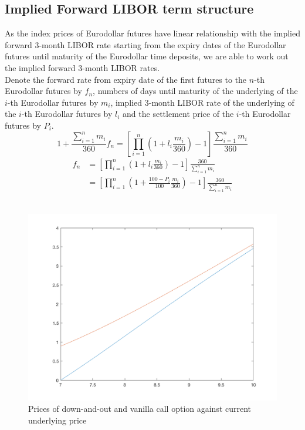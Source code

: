 \subsection{Implied Forward LIBOR term structure}
As the index prices of Eurodollar futures have linear relationship with the implied forward 3-month LIBOR rate starting from the expiry dates of the Eurodollar futures until maturity of the Eurodollar time deposits, we are able to work out the implied forward 3-month LIBOR rates.\\[4mm]
Denote the forward rate from expiry date of the first futures to the $n$-th Eurodollar futures by $f_{n}$, numbers of days until maturity of the underlying of the $i$-th Eurodollar futures by $m_{i}$, implied 3-month LIBOR rate of the underlying of the $i$-th Eurodollar futures by $l_{i}$ and the settlement price of the $i$-th Eurodollar futures by $P_{i}$.\\[4mm]
$$1 + \frac{\sum_{i=1}^{n} m_{i}}{360}f_{n} = [\prod_{i=1}^{n} (1 + l_{i}\frac{m_{i}}{360}) - 1] \frac{\sum_{i=1}^{n} m_{i}}{360}$$
\begin{equation}
\begin{split}
f_{n} &= [\prod_{i=1}^{n} (1 + l_{i}\frac{m_{i}}{360}) - 1] \frac{360}{\sum_{i=1}^{n} m_{i}}\\
&= [\prod_{i=1}^{n} (1 + \frac{100 - P_{i}}{100}\frac{m_{i}}{360}) - 1] \frac{360}{\sum_{i=1}^{n} m_{i}}
\end{split}
\end{equation}
\\[4mm]
\begin{figure}[h]
	\centering
	\includegraphics[scale=0.3]{A1_1_plot.png}
	\caption{Prices of down-and-out and vanilla call option against current underlying price}
\end{figure}
\\[2mm]
\newpage

